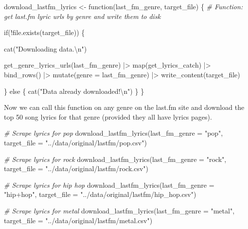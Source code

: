 \documentclass[
  letterpaper,
]{scrbook}
\newenvironment{Shaded}{\begin{snugshade}}{\end{snugshade}}
\newcommand{\AttributeTok}[1]{\textcolor[rgb]{0.00,0.00,0.00}{#1}}
\newcommand{\CommentTok}[1]{\textcolor[rgb]{0.00,0.00,0.00}{\textit{#1}}}
\newcommand{\ControlFlowTok}[1]{\textcolor[rgb]{0.00,0.00,0.00}{#1}}
\newcommand{\FunctionTok}[1]{\textcolor[rgb]{0.00,0.00,0.00}{#1}}
\newcommand{\NormalTok}[1]{\textcolor[rgb]{0.00,0.00,0.00}{#1}}
\newcommand{\OtherTok}[1]{\textcolor[rgb]{0.00,0.00,0.00}{#1}}
\newcommand{\SpecialCharTok}[1]{\textcolor[rgb]{0.00,0.00,0.00}{#1}}
\newcommand{\StringTok}[1]{\textcolor[rgb]{0.00,0.00,0.00}{#1}}
\begin{document}
\begin{Shaded}
\begin{Highlighting}[]
\NormalTok{download\_lastfm\_lyrics }\OtherTok{\textless{}{-}} \ControlFlowTok{function}\NormalTok{(last\_fm\_genre, target\_file) \{}
  \CommentTok{\# Function: get last.fm lyric urls by genre and write them to disk}
  
  \ControlFlowTok{if}\NormalTok{(}\SpecialCharTok{!}\FunctionTok{file.exists}\NormalTok{(target\_file)) \{}
    
    \FunctionTok{cat}\NormalTok{(}\StringTok{"Downloading data.}\SpecialCharTok{\textbackslash{}n}\StringTok{"}\NormalTok{)}
    
    \FunctionTok{get\_genre\_lyrics\_urls}\NormalTok{(last\_fm\_genre) }\SpecialCharTok{|\textgreater{}} 
      \FunctionTok{map}\NormalTok{(get\_lyrics\_catch) }\SpecialCharTok{|\textgreater{}} 
      \FunctionTok{bind\_rows}\NormalTok{() }\SpecialCharTok{|\textgreater{}} 
      \FunctionTok{mutate}\NormalTok{(}\AttributeTok{genre =}\NormalTok{ last\_fm\_genre) }\SpecialCharTok{|\textgreater{}} 
      \FunctionTok{write\_content}\NormalTok{(target\_file)}
    
\NormalTok{  \} }\ControlFlowTok{else}\NormalTok{ \{}
    \FunctionTok{cat}\NormalTok{(}\StringTok{"Data already downloaded!}\SpecialCharTok{\textbackslash{}n}\StringTok{"}\NormalTok{)}
\NormalTok{  \}}
\NormalTok{\}}
\end{Highlighting}
\end{Shaded}

Now we can call this function on any genre on the last.fm site and
download the top 50 song lyrics for that genre (provided they all have
lyrics pages).

\begin{Shaded}
\begin{Highlighting}[]
\CommentTok{\# Scrape lyrics for \textquotesingle{}pop\textquotesingle{}}
\FunctionTok{download\_lastfm\_lyrics}\NormalTok{(}\AttributeTok{last\_fm\_genre =} \StringTok{"pop"}\NormalTok{, }\AttributeTok{target\_file =} \StringTok{"../data/original/lastfm/pop.csv"}\NormalTok{)}

\CommentTok{\# Scrape lyrics for \textquotesingle{}rock\textquotesingle{}}
\FunctionTok{download\_lastfm\_lyrics}\NormalTok{(}\AttributeTok{last\_fm\_genre =} \StringTok{"rock"}\NormalTok{, }\AttributeTok{target\_file =} \StringTok{"../data/original/lastfm/rock.csv"}\NormalTok{)}

\CommentTok{\# Scrape lyrics for \textquotesingle{}hip hop\textquotesingle{}}
\FunctionTok{download\_lastfm\_lyrics}\NormalTok{(}\AttributeTok{last\_fm\_genre =} \StringTok{"hip+hop"}\NormalTok{, }\AttributeTok{target\_file =} \StringTok{"../data/original/lastfm/hip\_hop.csv"}\NormalTok{)}

\CommentTok{\# Scrape lyrics for \textquotesingle{}metal\textquotesingle{}}
\FunctionTok{download\_lastfm\_lyrics}\NormalTok{(}\AttributeTok{last\_fm\_genre =} \StringTok{"metal"}\NormalTok{, }\AttributeTok{target\_file =} \StringTok{"../data/original/lastfm/metal.csv"}\NormalTok{)}
\end{Highlighting}
\end{Shaded}
\end{document}
